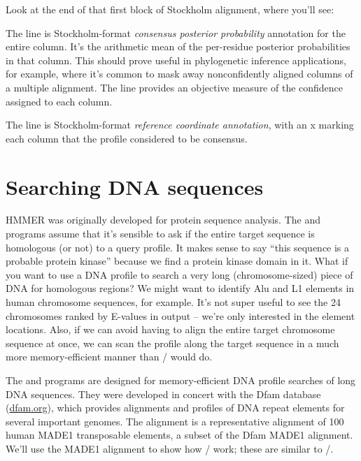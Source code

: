 Look at the end of that first block of Stockholm alignment, where you'll
see:


The  line is Stockholm-format \emph{consensus
  posterior probability} annotation for the entire column. It's the
arithmetic mean of the per-residue posterior probabilities in that
column. This should prove useful in phylogenetic inference
applications, for example, where it's common to mask away
nonconfidently aligned columns of a multiple alignment. The
 line provides an objective measure of the confidence
assigned to each column.

The  line is Stockholm-format \emph{reference
  coordinate annotation}, with an x marking each column that the
profile considered to be consensus.



\section{Searching DNA sequences}

HMMER was originally developed for protein sequence analysis. The
 and  programs assume that it's sensible
to ask if the entire target sequence is homologous (or not) to a query
profile. It makes sense to say ``this sequence is a probable protein
kinase'' because we find a protein kinase domain in it.  What if you
want to use a DNA profile to search a very long (chromosome-sized)
piece of DNA for homologous regions?  We might want to identify Alu
and L1 elements in human chromosome sequences, for example. It's not
super useful to see the 24 chromosomes ranked by E-values in
 output -- we're only interested in the element
locations. Also, if we can avoid having to align the entire target
chromosome sequence at once, we can scan the profile along the target
sequence in a much more memory-efficient manner than
/ would do.

The  and  programs are designed for
memory-efficient DNA profile searches of long DNA sequences. They were
developed in concert with the Dfam database (\url{dfam.org}), which
provides alignments and profiles of DNA repeat elements
for several important genomes.  The alignment
 is a representative alignment of 100 human
MADE1 transposable elements, a subset of the Dfam MADE1
alignment. We'll use the MADE1 alignment to show how
/ work; these are similar to
/.

